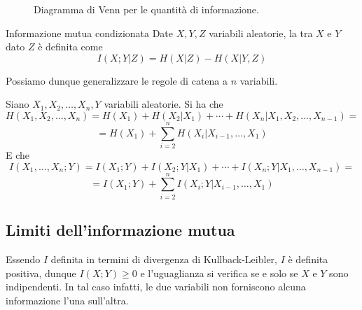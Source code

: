 \begin{figure}[H]
  \centering
  \caption{Diagramma di Venn per le quantità di informazione.}\label{fig:venn_info}
\end{figure}

\begin{definition}{Informazione mutua condizionata}
  Date \(X,Y,Z\) variabili aleatorie, la  tra \(X\) e \(Y\) dato \(Z\) è definita come
  \[I(X;Y|Z) = H(X|Z) - H(X|Y,Z)\]
\end{definition}

Possiamo dunque generalizzare le regole di catena a \(n\) variabili.

\begin{proposition}[label=prop:general-chain-rule]{}
  Siano \(X_1, X_2, \ldots, X_n, Y\) variabili aleatorie.
  Si ha che
  \[H(X_1, X_2, \ldots, X_n) = H(X_1) + H(X_2|X_1) + \cdots + H(X_n | X_1, X_2, \ldots, X_{n-1}) = \]
  \[=H(X_1) + \sum_{i=2}^{n} H(X_i | X_{i-1}, \ldots, X_1)\]
  E che
  \[I(X_1, \ldots, X_n; Y) = I(X_1; Y) + I(X_2; Y | X_1) + \cdots + I(X_n; Y | X_1, \ldots, X_{n-1}) = \]
  \[=I(X_1;Y) + \sum_{i=2}^{n} I(X_i; Y | X_{i-1}, \ldots, X_1)\]
\end{proposition}

\subsection{Limiti dell'informazione mutua}\label{subs:mutual_information_limits}

Essendo \(I\) definita in termini di divergenza di Kullback-Leibler, \(I\) è definita positiva, dunque \(I(X;Y) \geq 0\) e l'uguaglianza si verifica se e solo se \(X\) e \(Y\) sono indipendenti.
In tal caso infatti, le due variabili non forniscono alcuna informazione l'una sull'altra.

